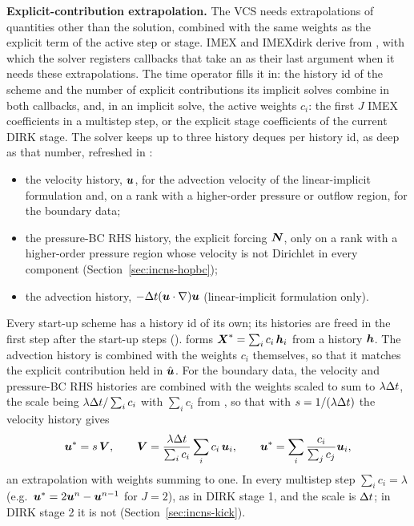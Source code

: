\textbf{Explicit-contribution extrapolation.} The VCS needs
extrapolations of quantities other than the solution, combined with the same
weights as the explicit term of the active step or stage. IMEX and IMEXdirk
derive from , with which the solver registers
callbacks that take an  as their last argument
when it needs these extrapolations. The time operator fills it in: the
history id of the scheme and the number of explicit contributions its
implicit solves combine in both callbacks, and, in an implicit solve, the
active weights $c_i$: the first $J$ IMEX coefficients in a multistep step, or
the explicit stage coefficients of the current DIRK stage. The solver keeps
up to three history deques per history id, as deep as that number, refreshed
in
:
\begin{itemize}
  \item the velocity history, $\boldsymbol{u}$, for the advection velocity of the
  linear-implicit formulation and, on a rank with a higher-order pressure or
  outflow region, for the boundary data;
  \item the pressure-BC RHS history, the explicit forcing $\boldsymbol{N}$, only on
  a rank with a higher-order pressure region whose velocity is not Dirichlet
  in every component (Section~\ref{sec:incns-hopbc});
  \item the advection history, $-\Delta t(\boldsymbol{u}\cdot\nabla)\boldsymbol{u}$
  (linear-implicit formulation only).
\end{itemize}
Every start-up scheme has a history id of its own; its histories are freed
in the first step after the start-up steps ().
 forms
$\boldsymbol{X}^*=\sum_i c_i\,\boldsymbol{h}_i$ from a history $\boldsymbol{h}$. The
advection history is combined with the weights $c_i$ themselves, so that it
matches the explicit contribution held in $\hat{\boldsymbol{u}}$. For the
boundary data, the velocity and pressure-BC RHS histories are combined with the weights scaled to sum to $\lambda\Delta t$,
the scale being $\lambda\Delta t/\sum_ic_i$ with $\sum_ic_i$ from
, so that with
$s=1/(\lambda\Delta t)$ the velocity history gives
\begin{equation}
  \boldsymbol{u}^* = s\,\boldsymbol{V},\qquad
  \boldsymbol{V}=\frac{\lambda\Delta t}{\sum_i c_i}\sum_i c_i\,\boldsymbol{u}_i,
  \qquad
  \boldsymbol{u}^* = \sum_i\frac{c_i}{\sum_j c_j}\boldsymbol{u}_i ,
  \label{eq:incns-ustar}
\end{equation}
an extrapolation with weights summing to one. In every multistep step
$\sum_i c_i=\lambda$ (e.g.\ $\boldsymbol{u}^*=2\boldsymbol{u}^n-\boldsymbol{u}^{n-1}$ for
$J=2$), as in DIRK stage 1, and the scale is $\Delta t$; in DIRK stage 2 it
is not (Section~\ref{sec:incns-kick}).

